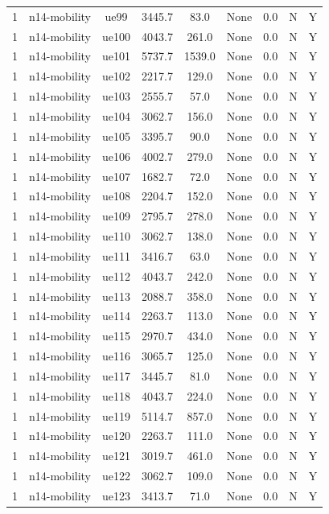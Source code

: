 \begin{table}[ht]
\begin{tabular}{|c|c|c|c|c|c|c|c|c|}
1 & n14-mobility & ue99 & 3445.7 & 83.0 & None & 0.0 & N & Y \\
1 & n14-mobility & ue100 & 4043.7 & 261.0 & None & 0.0 & N & Y \\
1 & n14-mobility & ue101 & 5737.7 & 1539.0 & None & 0.0 & N & Y \\
1 & n14-mobility & ue102 & 2217.7 & 129.0 & None & 0.0 & N & Y \\
1 & n14-mobility & ue103 & 2555.7 & 57.0 & None & 0.0 & N & Y \\
1 & n14-mobility & ue104 & 3062.7 & 156.0 & None & 0.0 & N & Y \\
1 & n14-mobility & ue105 & 3395.7 & 90.0 & None & 0.0 & N & Y \\
1 & n14-mobility & ue106 & 4002.7 & 279.0 & None & 0.0 & N & Y \\
1 & n14-mobility & ue107 & 1682.7 & 72.0 & None & 0.0 & N & Y \\
1 & n14-mobility & ue108 & 2204.7 & 152.0 & None & 0.0 & N & Y \\
1 & n14-mobility & ue109 & 2795.7 & 278.0 & None & 0.0 & N & Y \\
1 & n14-mobility & ue110 & 3062.7 & 138.0 & None & 0.0 & N & Y \\
1 & n14-mobility & ue111 & 3416.7 & 63.0 & None & 0.0 & N & Y \\
1 & n14-mobility & ue112 & 4043.7 & 242.0 & None & 0.0 & N & Y \\
1 & n14-mobility & ue113 & 2088.7 & 358.0 & None & 0.0 & N & Y \\
1 & n14-mobility & ue114 & 2263.7 & 113.0 & None & 0.0 & N & Y \\
1 & n14-mobility & ue115 & 2970.7 & 434.0 & None & 0.0 & N & Y \\
1 & n14-mobility & ue116 & 3065.7 & 125.0 & None & 0.0 & N & Y \\
1 & n14-mobility & ue117 & 3445.7 & 81.0 & None & 0.0 & N & Y \\
1 & n14-mobility & ue118 & 4043.7 & 224.0 & None & 0.0 & N & Y \\
1 & n14-mobility & ue119 & 5114.7 & 857.0 & None & 0.0 & N & Y \\
1 & n14-mobility & ue120 & 2263.7 & 111.0 & None & 0.0 & N & Y \\
1 & n14-mobility & ue121 & 3019.7 & 461.0 & None & 0.0 & N & Y \\
1 & n14-mobility & ue122 & 3062.7 & 109.0 & None & 0.0 & N & Y \\
1 & n14-mobility & ue123 & 3413.7 & 71.0 & None & 0.0 & N & Y \\

\end{tabular}
\end{table}
